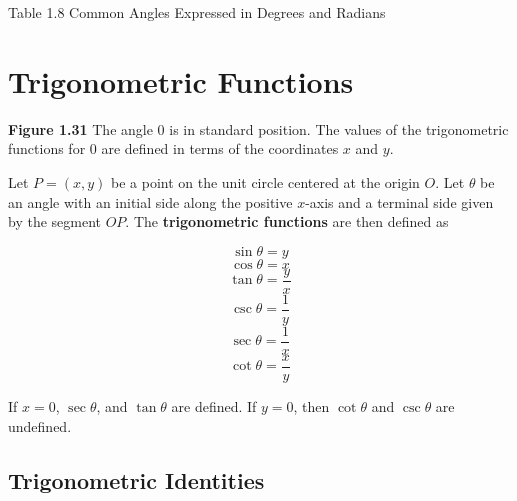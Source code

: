 \documentclass{book}
\begin{document}
	Table 1.8 Common Angles Expressed in Degrees and Radians

\section{Trigonometric Functions}


	\textbf{Figure 1.31} The angle \(0\) is in standard position. The values of the trigonometric functions for \(0\) are defined in terms of the coordinates \(x\) and \(y\).

	\newpage 
Let \(P=(x,y)\) be a point on the unit circle centered at the origin \(O\). Let \(\theta\) be an angle with an initial side along the positive \(x\)-axis and a terminal side given by the segment \(OP\). The \textbf{trigonometric functions} are then defined as 

\[\sin\theta=y\]
\[\cos\theta=x\]
\[\tan\theta=\frac{y}{x}\]
\[\csc\theta=\frac{1}{y}\]
\[\sec\theta=\frac{1}{x}\]
\[\cot\theta=\frac{x}{y}\]

If \(x=0\), \(\sec\theta\), and \(\tan\theta\) are defined. If \(y=0\), then \(\cot\theta\) and \(\csc \theta\) are undefined. 

\subsection{Trigonometric Identities} 
\end{document}
